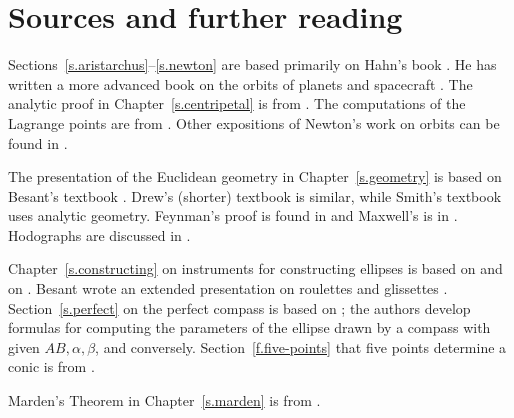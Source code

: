 
\chapter*{Sources and further reading}


Sections~\ref{s.aristarchus}--\ref{s.newton} are based primarily on Hahn's book \cite{hahn-cic}. He has written a more advanced book on the orbits of planets and spacecraft \cite{hahn-orbits}. The analytic proof in Chapter~\ref{s.centripetal} is from \cite{griffiths}. The computations of the Lagrange points are from \cite{stern}. Other expositions of Newton's work on orbits can be found in \cite{hauser-lang,stein}. 

The presentation of the Euclidean geometry in Chapter~\ref{s.geometry} is based on Besant's textbook \cite{besant}. Drew's (shorter) textbook \cite{drew} is similar, while Smith's textbook \cite{smith} uses analytic geometry. Feynman's proof is found in \cite{lost} and Maxwell's is in \cite[Article CXXXIII]{maxwell}. Hodographs are discussed in \cite{hodograph}.

Chapter~\ref{s.constructing} on instruments for constructing ellipses is based on \cite[Chapter~X]{besant} and on \cite{van-maanen}. Besant wrote an extended presentation on roulettes and glissettes \cite{besant-r-g}. Section~\ref{s.perfect} on the perfect compass is based on \cite{henk}; the authors develop formulas for computing the parameters of the ellipse drawn by a compass with given $AB,\alpha,\beta$, and conversely. Section~\ref{f.five-points} that five points determine a conic is from 
\cite[Arts.~167, 205]{smith}.

Marden's Theorem in Chapter~\ref{s.marden} is from \cite{marden}.

\begin{small}


\end{small}
